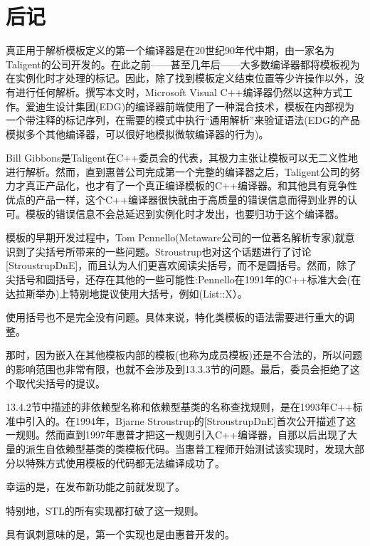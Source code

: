 \section{后记}
真正用于解析模板定义的第一个编译器是在20世纪90年代中期，由一家名为Taligent的公司开发的。在此之前——甚至几年后——大多数编译器都将模板视为在实例化时才处理的标记。因此，除了找到模板定义结束位置等少许操作以外，没有进行任何解析。撰写本文时，Microsoft Visual C++编译器仍然以这种方式工作。爱迪生设计集团(EDG)的编译器前端使用了一种混合技术，模板在内部视为一个带注释的标记序列，在需要的模式中执行“通用解析”来验证语法(EDG的产品模拟多个其他编译器，可以很好地模拟微软编译器的行为)。

Bill Gibbons是Taligent在C++委员会的代表，其极力主张让模板可以无二义性地进行解析。然而，直到惠普公司完成第一个完整的编译器之后，Taligent公司的努力才真正产品化，也才有了一个真正编译模板的C++编译器。和其他具有竞争性优点的产品一样，这个C++编译器很快就由于高质量的错误信息而得到业界的认可。模板的错误信息不会总延迟到实例化时才发出，也要归功于这个编译器。

模板的早期开发过程中，Tom Pennello(Metaware公司的一位著名解析专家)就意识到了尖括号所带来的一些问题。Stroustrup也对这个话题进行了讨论[StroustrupDnE]，而且认为人们更喜欢阅读尖括号，而不是圆括号。然而，除了尖括号和圆括号，还存在其他的一些可能性:Pennello在1991年的C++标准大会(在达拉斯举办)上特别地提议使用大括号，例如(List{::X}）。

\begin{notice}
使用括号也不是完全没有问题。具体来说，特化类模板的语法需要进行重大的调整。
\end{notice}

那时，因为嵌入在其他模板内部的模板(也称为成员模板)还是不合法的，所以问题的影响范围也非常有限，也就不会涉及到13.3.3节的问题。最后，委员会拒绝了这个取代尖括号的提议。

13.4.2节中描述的非依赖型名称和依赖型基类的名称查找规则，是在1993年C++标准中引入的。在1994年，Bjarne Stroustrup的[StroustrupDnE]首次公开描述了这一规则。然而直到1997年惠普才把这一规则引入C++编译器，自那以后出现了大量的派生自依赖型基类的类模板代码。当惠普工程师开始测试该实现时，发现大部分以特殊方式使用模板的代码都无法编译成功了。

\begin{notice}
幸运的是，在发布新功能之前就发现了。
\end{notice}

特别地，STL的所有实现都打破了这一规则。

\begin{notice}
具有讽刺意味的是，第一个实现也是由惠普开发的。
\end{notice}

